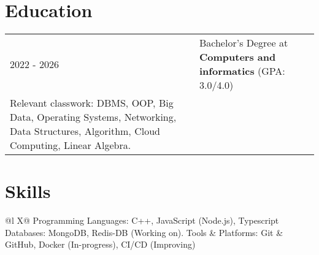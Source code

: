 \documentclass[a4paper,12pt]{article}
\begin{document}
\section{Education}
\begin{tabularx}{\linewidth}{@{}l X@{}}	
2022 - 2026 & Bachelor's Degree at \textbf{Computers and informatics} \hfill (GPA: 3.0/4.0) \\ 
Relevant classwork: DBMS, OOP, Big Data, Operating Systems, Networking, Data Structures, Algorithm, Cloud Computing, Linear Algebra.
\end{tabularx}


\section{Skills}
\begin{tabularx}{\linewidth}{@{}l X@{}}
 \normalsize{Programming Languages: C++, JavaScript (Node.js), Typescript
Databases: MongoDB, Redis-DB (Working on).
Tools & Platforms: Git & GitHub, Docker (In-progress), CI/CD (Improving)
}\\  
\end{tabularx}

\vfill
{}
\end{document}
